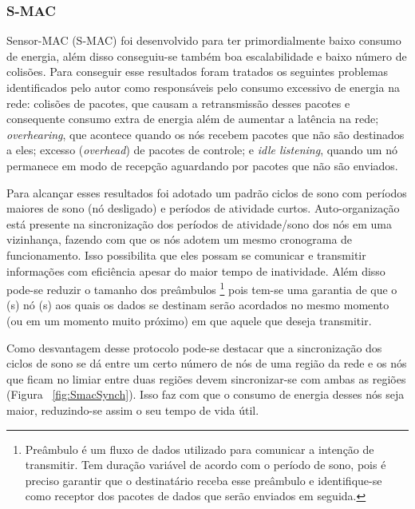  \subsubsection{S-MAC}
 \label{sec:smac}
 
Sensor-MAC (S-MAC) \cite{ye04} foi desenvolvido para ter primordialmente baixo consumo de energia, além disso conseguiu-se também boa escalabilidade e baixo número de colisões. Para conseguir esse resultados foram tratados os seguintes problemas identificados pelo autor como responsáveis pelo consumo excessivo de energia na rede: colisões de pacotes, que causam a retransmissão desses pacotes e consequente consumo extra de energia além de aumentar a latência na rede; \textit{overhearing}, que acontece quando os nós recebem pacotes que não são destinados a eles; excesso (\textit{overhead}) de pacotes de controle; e \textit{idle listening}, quando um nó permanece em modo de recepção aguardando por pacotes que não são enviados.

Para alcançar esses resultados foi adotado um padrão ciclos de sono com períodos maiores de sono (nó desligado) e períodos de atividade curtos. Auto-organização está presente na sincronização dos períodos de atividade/sono dos nós em uma vizinhança, fazendo com que os nós adotem um mesmo cronograma de funcionamento. Isso possibilita que eles possam se comunicar e transmitir informações com eficiência apesar do maior tempo de inatividade. Além disso pode-se reduzir o tamanho dos preâmbulos%
 \footnote{Preâmbulo é um fluxo de dados utilizado para comunicar a intenção de transmitir. Tem duração variável de acordo com o período de sono, pois é preciso garantir que o destinatário receba esse preâmbulo e identifique-se como receptor dos pacotes de dados que serão enviados em seguida.}
 pois tem-se uma garantia de que o (s) nó (s) aos quais os dados se destinam serão acordados no mesmo momento (ou em um momento muito próximo) em que aquele que deseja transmitir.
 
Como desvantagem desse protocolo pode-se destacar que a sincronização dos ciclos de sono se dá entre um certo número de nós de uma região da rede e os nós que ficam no limiar entre duas regiões devem sincronizar-se com ambas as regiões (Figura ~\ref{fig:SmacSynch}). Isso faz com que o consumo de energia desses nós seja maior, reduzindo-se assim o seu tempo de vida útil.

